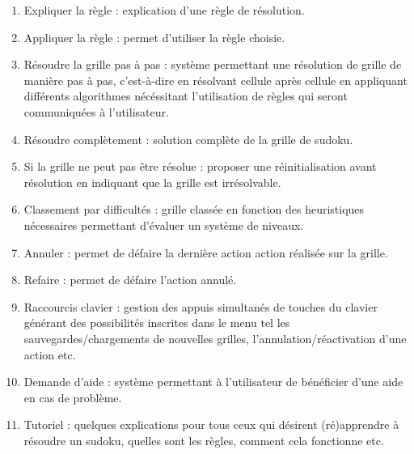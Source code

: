 \begin{enumerate}
  \item Expliquer la règle : explication d'une règle de résolution. \\
  
  \item Appliquer la règle : permet d'utiliser la règle choisie. \\
  
  \item Résoudre la grille pas à pas : système permettant une résolution 
  de grille de manière pas à pas, c'est-à-dire en résolvant cellule après cellule en appliquant 
  différents algorithmes nécéssitant l'utilisation de règles qui seront communiquées à l'utilisateur. \\
  
  \item Résoudre complètement : solution complète de la grille de sudoku. \\
  
  \item Si la grille ne peut pas être résolue : proposer une réinitialisation 
  avant résolution en indiquant que la grille est irrésolvable. \\
  
  \item Classement par difficultés : grille classée en fonction 
  des heuristiques nécessaires permettant d'évaluer un système de niveaux. \\
  
  \item Annuler : permet de défaire la dernière action action réalisée sur la grille.\\
  
  \item Refaire : permet de défaire l'action annulé. \\

  \item Raccourcis clavier : gestion des appuis simultanés de touches du clavier 
  générant des possibilités inscrites dans le menu tel les sauvegardes/chargements 
  de nouvelles grilles, l'annulation/réactivation d'une action etc.  \\  
  
  \item Demande d’aide : système permettant à l'utilisateur 
  de bénéficier d'une aide en cas de problème. \\

  \item Tutoriel : quelques explications pour tous ceux qui désirent (ré)apprendre 
  à résoudre un sudoku, quelles sont les règles, comment cela fonctionne etc.\\ 
  

\end{enumerate}
